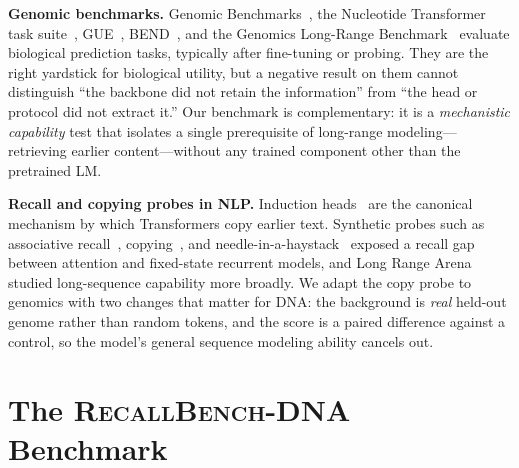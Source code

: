 \textbf{Genomic benchmarks.} Genomic Benchmarks~\cite{gresova2023genomicbenchmarks},
the Nucleotide Transformer task suite~\cite{dallatorre2025nt}, GUE~\cite{zhou2024dnabert2},
BEND~\cite{marin2024bend}, and the Genomics Long-Range Benchmark~\cite{trop2024lrb} evaluate
biological prediction tasks, typically after fine-tuning or probing. They are the right
yardstick for biological utility, but a negative result on them cannot distinguish ``the
backbone did not retain the information'' from ``the head or protocol did not extract it.''
Our benchmark is complementary: it is a \emph{mechanistic capability} test that isolates a
single prerequisite of long-range modeling---retrieving earlier content---without any
trained component other than the pretrained LM.

\textbf{Recall and copying probes in NLP.} Induction heads~\cite{olsson2022induction} are the
canonical mechanism by which Transformers copy earlier text. Synthetic probes such as
associative recall~\cite{arora2024zoology}, copying~\cite{jelassi2024repeat}, and
needle-in-a-haystack~\cite{kamradt2023needle,hsieh2024ruler} exposed a recall gap between
attention and fixed-state recurrent models, and Long Range Arena~\cite{tay2021lra} studied
long-sequence capability more broadly. We adapt the copy probe to genomics with two changes
that matter for DNA: the background is \emph{real} held-out genome rather than random tokens,
and the score is a paired difference against a control, so the model's general sequence
modeling ability cancels out.

\section{The \textsc{RecallBench-DNA} Benchmark}
\label{sec:benchmark}

